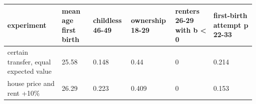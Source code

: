 \begingroup\small
\setlength{\tabcolsep}{3pt}
\renewcommand{\arraystretch}{1.04}
\begin{tabularx}{\linewidth}{XXXXXX}
\toprule
experiment & mean age first birth & childless 46-49 & ownership 18-29 & renters 26-29 with b \textless{} 0 & first-birth attempt p 22-33 \\
\midrule
certain transfer, equal expected value & 25.58 & 0.148 & 0.44 & 0 & 0.214 \\
house price and rent +10\% & 26.29 & 0.223 & 0.409 & 0 & 0.153 \\
\bottomrule
\end{tabularx}
\endgroup
